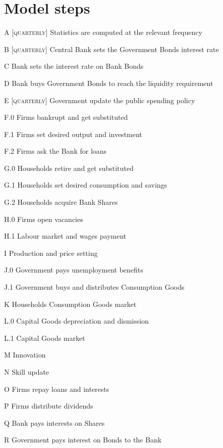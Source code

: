 \documentclass[a4paper, headings=standardclasses]{scrartcl}
\begin{document}
\section{Model steps}
\begin{steps}
    \item[A] [\textsc{quarterly}] Statistics are computed at the relevant frequency
    \item[B] [\textsc{quarterly}] Central Bank sets the Government Bonds interest rate
    \item[C] Bank sets the interest rate on Bank Bonds
    \item[D] Bank buys Government Bonds to reach the liquidity requirement
    \item[E] [\textsc{quarterly}] Government update the public spending policy
    \item[F.0] Firms bankrupt and get substituted
    \item[F.1] Firms set desired output and investment
    \item[F.2] Firms ask the Bank for loans
    \item[G.0] Households retire and get substituted
    \item[G.1] Households set desired consumption and savings
    \item[G.2] Households acquire Bank Shares
    \item[H.0] Firms open vacancies
    \item[H.1] Labour market and wages payment
    \item[I] Production and price setting
    \item[J.0] Government pays unemployment benefits
    \item[J.1] Government buys and distributes Consumption Goods
    \item[K] Households Consumption Goods market
    \item[L.0] Capital Goods depreciation and dismission
    \item[L.1] Capital Goods market
    \item[M] Innovation
    \item[N] Skill update
    \item[O] Firms repay loans and interests
    \item[P] Firms distribute dividends
    \item[Q] Bank pays interests on Shares
    \item[R] Government pays interest on Bonds to the Bank
\end{steps}
\end{document}
